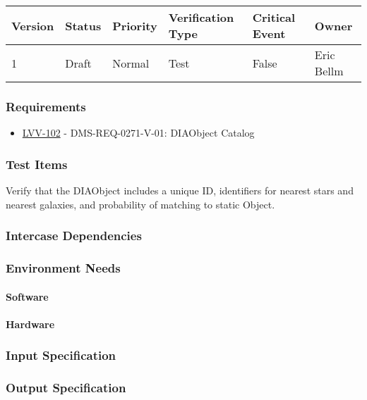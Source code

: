 \begin{longtable}[]{llllll}
\toprule
Version & Status & Priority & Verification Type & Critical Event & Owner
\\\midrule
1 & Draft & Normal &
Test & False & Eric Bellm
\\\bottomrule
\end{longtable}

\subsubsection{Requirements}
\begin{itemize}
\item \href{https://jira.lsstcorp.org/browse/LVV-102}{LVV-102} - DMS-REQ-0271-V-01: DIAObject Catalog
\end{itemize}

\subsubsection{Test Items}
Verify that the DIAObject includes a unique ID, identifiers for nearest
stars and nearest galaxies, and probability of matching to static
Object.



\subsubsection{Intercase Dependencies}

\subsubsection{Environment Needs}

\paragraph{Software}

\paragraph{Hardware}

\subsubsection{Input Specification}

\subsubsection{Output Specification}

